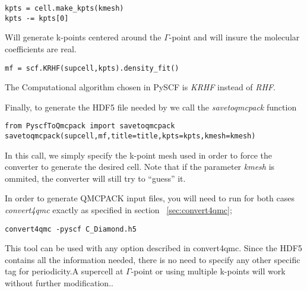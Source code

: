\begin{lstlisting}
kpts = cell.make_kpts(kmesh)
kpts -= kpts[0]
\end{lstlisting}
Will generate k-points centered around the $\Gamma$-point and will insure the molecular coefficients are real.\\

\begin{lstlisting}
mf = scf.KRHF(supcell,kpts).density_fit()
\end{lstlisting}
The Computational algorithm chosen in PySCF is \textit{KRHF} instead of \textit{RHF}.

Finally, to generate the HDF5 file needed by \qmcpack we call the \textit{savetoqmcpack} function\\
\begin{lstlisting}
from PyscfToQmcpack import savetoqmcpack
savetoqmcpack(supcell,mf,title=title,kpts=kpts,kmesh=kmesh)
\end{lstlisting}
In this call, we simply specify the k-point mesh used in order to force the converter to generate the desired cell. Note that if the parameter \textit{kmesh} is ommited, the converter will still try to ``guess'' it.



In order to generate QMCPACK input files, you will need to run for both cases \textit{convert4qmc} exactly as specified in section ~\ref{sec:convert4qmc};
\begin{lstlisting}
convert4qmc -pyscf C_Diamond.h5
\end{lstlisting}

This tool can be used with any option described in convert4qmc. Since
the HDF5 contains all the information needed, there is no need to
specify any other specific tag for periodicity.A supercell at
$\Gamma$-point or using multiple k-points will work without further
modification..

